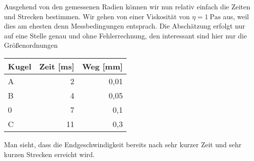 \documentclass[a4paper,german,12pt,smallheadings]{scrartcl}
\begin{document}
Ausgehend von den gemessenen Radien können wir nun relativ einfach die Zeiten
und Strecken bestimmen. Wir gehen von einer Viskosität von $\eta =
\SI{1}{\pascal \second}$ aus, weil dies am ehesten denn Messbedingungen
entsprach. Die Abschätzung erfolgt nur auf eine Stelle genau und ohne
Fehlerrechnung, den interessant sind hier nur die Größenordnungen

\vspace{0.5 cm}
\begin{tabular}{l|r|r}
  Kugel & Zeit [ms] & Weg [mm] \\
  \hline
  A & 2 & 0{,}01 \\
  B & 4 & 0{,}05 \\
  0 & 7 & 0{,}1 \\
  C & 11 & 0{,}3
\end{tabular}
\vspace{0.5 cm}

Man sieht, dass die Endgeschwindigkeit bereits nach sehr kurzer Zeit und sehr
kurzen Strecken erreicht wird.









\begin{landscape}
  
\end{landscape}
\end{document}
